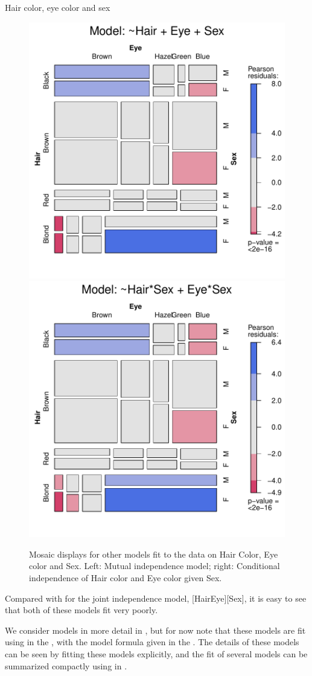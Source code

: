 \documentclass[11pt]{book}
\renewenvironment{knitrout}{\small\renewcommand{\baselinestretch}{.85}}{} %
\begin{document}
\begin{Example}[HEC2]{Hair color, eye color and sex}
\begin{knitrout}
\begin{figure}[!htbp]
\centerline{\includegraphics[width=.49\textwidth]{ch05/fig/HEC-mos21} 
\includegraphics[width=.49\textwidth]{ch05/fig/HEC-mos22} }

\caption[Mosaic displays for other models fit to the data on Hair Color, Eye color and Sex]{Mosaic displays for other models fit to the data on Hair Color, Eye color and Sex.  Left: Mutual independence model; right: Conditional independence of Hair color and Eye color given Sex.\label{fig:HEC-mos2}}
\end{figure}


\end{knitrout}
\noindent Compared with  for the joint independence model, [HairEye][Sex],
it is easy to see that both of these models fit very poorly.

We consider \loglin models in more detail in , but for now
note that these models are fit using  in the , 
with the model formula given in the .  The details of these
models can be seen by fitting these models explicitly, and the fit of
several models can be summarized compactly using 
in .


\end{Example}
\end{document}
